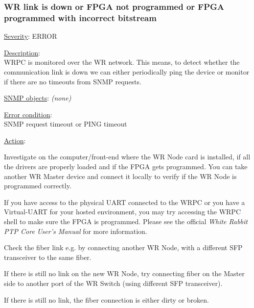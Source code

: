 \subsubsection{\bf WR link is down or FPGA not programmed or FPGA programmed with incorrect bitstream}
		\label{fail:timing:master_down}
		\begin{pck_descr}
			\item [] \underline{Severity}: ERROR
			\item [] \underline{Description}:\\
        WRPC is monitored over the WR network. This means, to detect whether
        the communication link is down we can either periodically ping the
        device or monitor if there are no timeouts from SNMP requests. 
			\item [] \underline{SNMP objects}: \emph{(none)}
			\item [] \underline{Error condition}:\\
				{\footnotesize
				SNMP request timeout or PING timeout}
      \item [] \underline{Action}:
        \begin{pck_proc}
        \item Investigate on the computer/front-end where the WR Node card is
          installed, if all the drivers are properly loaded and if the FPGA gets
          programmed. You can take another WR Master device and connect it
          locally to verify if the WR Node is programmed correctly.
        \item If you have access to the physical UART connected to the WRPC or
          you have a Virtual-UART for your hosted environment, you may try
          accessing the WRPC shell to make sure the FPGA is programmed. Please
          see the official \emph{White Rabbit PTP Core User's Manual} for more
          information.
        \item Check the fiber link e.g. by connecting another WR Node, with a
          different SFP transceiver to the same fiber.
        \item If there is still no link on the new WR Node, try connecting
          fiber on the Master side to another port of the WR Switch (using
          different SFP transceiver).
        \item If there is still no link, the fiber connection is either dirty or
          broken.
        \end{pck_proc}
		\end{pck_descr}


